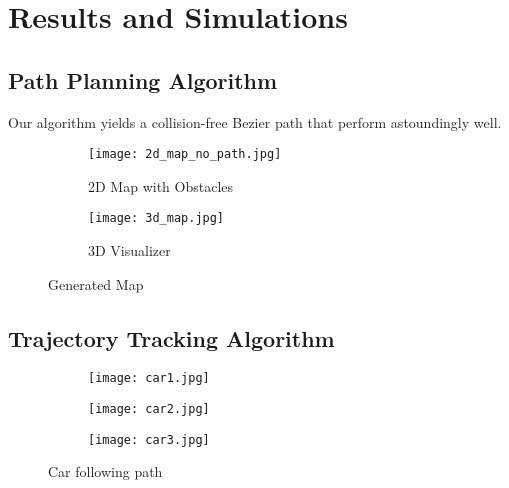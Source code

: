 \section{Results and Simulations}
  \subsection{Path Planning Algorithm}
  Our algorithm yields a collision-free Bezier path that perform astoundingly well.
  \begin{figure}[H]
    \centering
    \begin{subfigure}[b]{0.45\textwidth}
        \texttt{[image: 2d\_map\_no\_path.jpg]}
        \caption{2D Map with Obstacles}
    \end{subfigure}
    \begin{subfigure}[b]{0.47\textwidth}
        \texttt{[image: 3d\_map.jpg]}
        \caption{3D Visualizer}
    \end{subfigure}
    \caption{Generated Map} %
  \end{figure}

  \subsection{Trajectory Tracking Algorithm}
  \begin{figure}[H]
    \centering
    \begin{subfigure}[b]{0.45\textwidth}
        \texttt{[image: car1.jpg]}
    \end{subfigure}
    \begin{subfigure}[b]{0.47\textwidth}
        \texttt{[image: car2.jpg]}
    \end{subfigure}
    \begin{subfigure}[b]{0.47\textwidth}
        \texttt{[image: car3.jpg]}
    \end{subfigure}
    \caption{Car following path} %
  \end{figure}
